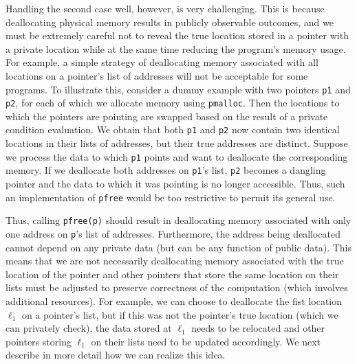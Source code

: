 \documentclass[11pt]{article}
\begin{document}
Handling the second case well, however, is very challenging. This is because
deallocating physical memory results in publicly observable outcomes, and
we must be extremely careful not to reveal the true location stored in a
pointer with a private location while at the same time reducing the
program's memory usage. For example, a simple strategy of deallocating
memory associated with all locations on a pointer's list of addresses will
not be acceptable for some programs. To illustrate this, consider a dummy
example with two pointers \texttt{p1} and \texttt{p2}, for each of which we
allocate memory using \texttt{pmalloc}. Then the locations to which the
pointers are pointing are swapped based on the result of a private condition
evaluation. We obtain that both \texttt{p1} and \texttt{p2} now contain two
identical locations in their lists of addresses, but their true addresses
are distinct. Suppose we process the data to which \texttt{p1} points and
want to deallocate the corresponding memory. If we deallocate both addresses
on \texttt{p1}'s list, \texttt{p2} becomes a dangling pointer and the data
to which it was pointing is no longer accessible. Thus, such an
implementation of \texttt{pfree} would be too restrictive to permit its
general use. 

Thus, calling \texttt{pfree(p)} should result in deallocating memory
associated with only one address on \texttt{p}'s list of addresses.
Furthermore, the address being deallocated cannot depend on any private data
(but can be any function of public data). This means that we are not
necessarily deallocating memory associated with the true location of the
pointer and other pointers that store the same location on their lists must
be adjusted to preserve correctness of the computation (which involves
additional resources). For example, we can choose to deallocate the fist
location $\ell_1$ on a pointer's list, but if this was not the pointer's
true location (which we can privately check), the data stored at $\ell_1$
needs to be relocated and other pointers storing $\ell_1$ on their lists
need to be updated accordingly. We next describe in more detail how we can
realize this idea.
\end{document}
